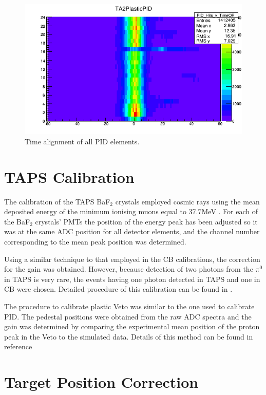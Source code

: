\begin{figure}[H]
\begin{center}
\includegraphics[scale=0.55]{pidtdcoffset.png}
\caption{Time alignment of all PID elements.}
\label{pidtdcoffset}
\end{center}
\end{figure}

\section{TAPS Calibration}

\indent The calibration of the TAPS BaF$_{2}$ crystals employed cosmic rays using the mean deposited energy of the minimum ionising muons equal to 37.7MeV \cite{roebig}. For each of the BaF$_{2}$ crystals' PMTs the position of the energy peak has been adjusted so it was at the same ADC position for all detector elements, and the channel number corresponding to the mean peak position was determined.

\indent Using a similar technique to that employed in the CB calibrations, the correction for the gain was obtained. However, because detection of two photons from the $\pi^{0}$ in TAPS is very rare, the events having one photon detected in TAPS and one in CB were chosen. Detailed procedure of this calibration can be found in \cite{lemmer}.

\indent The procedure to calibrate plastic Veto was similar to the one used to calibrate PID. The pedestal positions were obtained from the raw ADC spectra and the gain was determined by comparing the experimental mean position of the proton peak in the Veto to the simulated data. Details of this method can be found in reference \cite{gessler}

\section{Target Position Correction}


   


